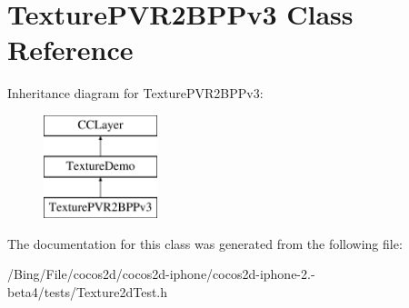 \hypertarget{interface_texture_p_v_r2_b_p_pv3}{\section{Texture\-P\-V\-R2\-B\-P\-Pv3 Class Reference}
\label{interface_texture_p_v_r2_b_p_pv3}
}
Inheritance diagram for Texture\-P\-V\-R2\-B\-P\-Pv3\-:\begin{figure}[H]
\begin{center}
\leavevmode
\includegraphics[height=3.000000cm]{interface_texture_p_v_r2_b_p_pv3}
\end{center}
\end{figure}


The documentation for this class was generated from the following file\-:\begin{DoxyCompactItemize}
\item 
/\-Bing/\-File/cocos2d/cocos2d-\/iphone/cocos2d-\/iphone-\/2.-\/beta4/tests/Texture2d\-Test.\-h\end{DoxyCompactItemize}
